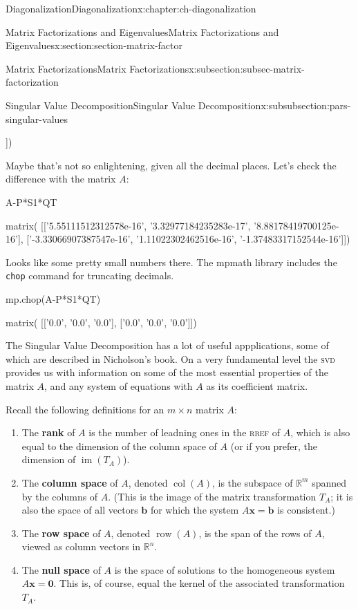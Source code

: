 \documentclass[oneside,10pt,]{book}
\newcommand{\mono}[1]{\texttt{#1}}
\newcommand{\initialism}[1]{\textsc{\MakeLowercase{#1}}}
\newcommand{\terminology}[1]{\textbf{#1}}
\numberwithin{equation}{section}
\newcommand{\R}{\mathbb{R}}
\newcommand{\im}{\operatorname{im}}
\newcommand{\csp}{\operatorname{col}}
\newcommand{\xx}{\mathbf{x}}
\newcommand{\zer}{\mathbf{0}}
\begin{document}
\begin{chapterptx}{Diagonalization}{}{Diagonalization}{}{}{x:chapter:ch-diagonalization}
\begin{sectionptx}{Matrix Factorizations and Eigenvalues}{}{Matrix Factorizations and Eigenvalues}{}{}{x:section:section-matrix-factor}
\begin{subsectionptx}{Matrix Factorizations}{}{Matrix Factorizations}{}{}{x:subsection:subsec-matrix-factorization}
\begin{subsubsectionptx}{Singular Value Decomposition}{}{Singular Value Decomposition}{}{}{x:subsubsection:pars-singular-values}
\begin{sageoutput}
 ['-1.0', '1.0', '1.37483317152544e-16']])
\end{sageoutput}
Maybe that's not so enlightening, given all the decimal places. Let's check the difference with the matrix \(A\):%
\begin{sageinput}
A-P*S1*QT
\end{sageinput}
\begin{sageoutput}
matrix(
[['5.55111512312578e-16', '3.32977184235283e-17', '8.88178419700125e-16'],
 ['-3.33066907387547e-16', '1.11022302462516e-16', '-1.37483317152544e-16']])
\end{sageoutput}
Looks like some pretty small numbers there. The mpmath library includes the \mono{chop} command for truncating decimals.%
\begin{sageinput}
mp.chop(A-P*S1*QT)
\end{sageinput}
\begin{sageoutput}
matrix(
[['0.0', '0.0', '0.0'],
 ['0.0', '0.0', '0.0']])
\end{sageoutput}
The Singular Value Decomposition has a lot of useful appplications, some of which are described in Nicholson's book. On a very fundamental level the \initialism{SVD} provides us with information on some of the most essential properties of the matrix \(A\), and any system of equations with \(A\) as its coefficient matrix.%
\par
Recall the following definitions for an \(m\times n\) matrix \(A\):%
\begin{enumerate}
\item{}The \terminology{rank} of \(A\) is the number of leadning ones in the \initialism{RREF} of \(A\), which is also equal to the dimension of the column space of \(A\) (or if you prefer, the dimension of \(\im (T_A)\)).%
\item{}The \terminology{column space} of \(A\), denoted \(\csp(A)\), is the subspace of \(\R^m\) spanned by the columns of \(A\). (This is the image of the matrix transformation \(T_A\); it is also the space of all vectors \(\mathbf{b}\) for which the system \(A\xx=\mathbf{b}\) is consistent.)%
\item{}The \terminology{row space} of \(A\), denoted \(\operatorname{row}(A)\), is the span of the rows of \(A\), viewed as column vectors in \(\R^n\).%
\item{}The \terminology{null space} of \(A\) is the space of solutions to the homogeneous system \(A\xx=\zer\). This is, of course, equal the kernel of the associated transformation \(T_A\).%
\end{enumerate}

\end{subsubsectionptx}
\end{subsectionptx}
\end{sectionptx}
\end{chapterptx}
\end{document}
